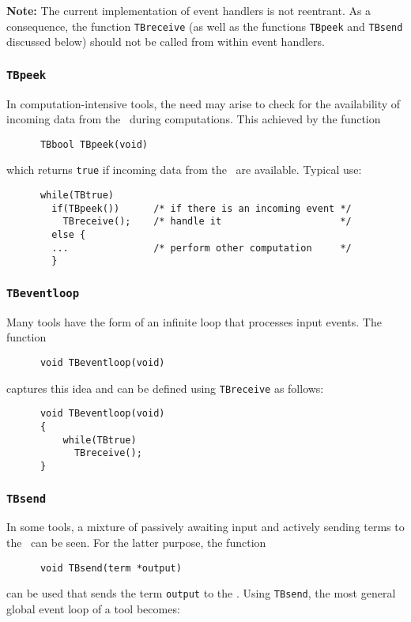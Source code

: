 {\bf Note:} The current implementation of event handlers is not reentrant.
As a consequence, the function {\tt TBreceive} (as well as the
functions {\tt TBpeek} and {\tt TBsend} discussed below)
should not be called from within event handlers.

\subsubsection{\label{TBpeek}{\tt TBpeek}}
In computation-intensive tools, the need may arise to
check for the availability of incoming data from the \TB\ during
computations. This achieved by the function
\begin{verbatim}
      TBbool TBpeek(void)
\end{verbatim}
which returns {\tt true} if incoming data from the \TB\ are available.
Typical use:
\begin{verbatim}
      while(TBtrue)
        if(TBpeek())      /* if there is an incoming event */
          TBreceive();    /* handle it                     */
        else {
        ...               /* perform other computation     */
        }
\end{verbatim}



\subsubsection{\label{TBeventloop}{\tt TBeventloop}}
Many tools have the form of an infinite loop
that processes input events.
The function
\begin{verbatim}
      void TBeventloop(void)
\end{verbatim}
captures this idea and can be
defined using {\tt TBreceive} as follows:
\begin{verbatim}
      void TBeventloop(void)
      {
          while(TBtrue)
            TBreceive();
      }
\end{verbatim}

\subsubsection{\label{TBsend}{\tt TBsend}}

In some tools, a mixture of passively awaiting input
and actively sending terms to the \TB\ can be seen.
For the latter purpose, the function
\begin{verbatim}
      void TBsend(term *output)
\end{verbatim}
can be used that sends the term {\tt output} to the \TB.
Using {\tt TBsend}, the most general global event loop of a tool becomes:

